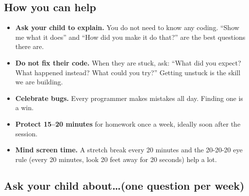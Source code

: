 \documentclass[level=3]{kidscode}
\begin{document}
\subsection{How you can help}
\begin{itemize}[itemsep=2pt]
  \item \textbf{Ask your child to explain.} You do not need to know any coding. \enquote{Show me
        what it does} and \enquote{How did you make it do that?} are the best questions there are.
  \item \textbf{Do not fix their code.} When they are stuck, ask: \enquote{What did you expect?
        What happened instead? What could you try?} Getting unstuck is the skill we are building.
  \item \textbf{Celebrate bugs.} Every programmer makes mistakes all day. Finding one is a win.
  \item \textbf{Protect 15--20 minutes} for homework once a week, ideally soon after the session.
  \item \textbf{Mind screen time.} A stretch break every 20 minutes and the 20-20-20 eye rule
        (every 20 minutes, look 20 feet away for 20 seconds) help a lot.
\end{itemize}

\clearpage
\subsection{Ask your child about\ldots (one question per week)}
\end{document}
